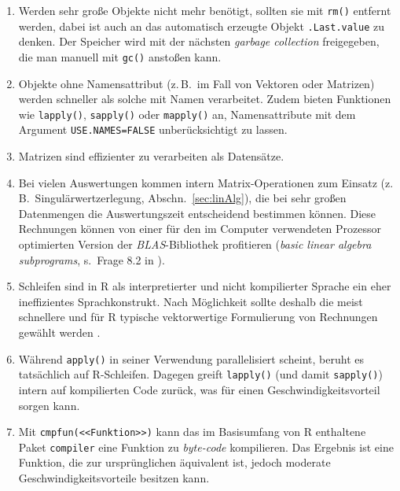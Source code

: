 \begin{enumerate}
\item Werden sehr große Objekte nicht mehr benötigt, sollten sie mit \lstinline!rm()! entfernt werden, dabei ist auch an das automatisch erzeugte Objekt \lstinline!.Last.value! zu denken. Der Speicher wird mit der nächsten \emph{garbage collection} freigegeben, die man manuell mit \lstinline!gc()! anstoßen kann.
\item Objekte ohne Namensattribut (z.\,B.\ im Fall von Vektoren oder Matrizen) werden schneller als solche mit Namen verarbeitet. Zudem bieten Funktionen wie \lstinline!lapply()!, \lstinline!sapply()! oder \lstinline!mapply()! an, Namensattribute mit dem Argument \lstinline!USE.NAMES=FALSE! unberücksichtigt zu lassen.
\item Matrizen sind effizienter zu verarbeiten als Datensätze.
\item \label{item:blas} Bei vielen Auswertungen kommen intern Matrix-Operationen zum Einsatz (z.\,B.\ Singulärwertzerlegung, Abschn.\ \ref{sec:linAlg}), die bei sehr großen Datenmengen die Auswertungszeit entscheidend bestimmen können. Diese Rechnungen können von einer für den im Computer verwendeten Prozessor optimierten Version der \emph{BLAS}-Bibliothek profitieren (\emph{basic linear algebra subprograms}, s.\ Frage 8.2 in ).
\item Schleifen sind in R als interpretierter und nicht kompilierter Sprache ein eher ineffizientes Sprachkonstrukt. Nach Möglichkeit sollte deshalb die meist schnellere und für R typische vektorwertige Formulierung von Rechnungen gewählt werden \cite{Ligges2008}.
\item Während \lstinline!apply()! in seiner Verwendung parallelisiert scheint, beruht es tatsächlich auf R-Schleifen. Dagegen greift \lstinline!lapply()! (und damit \lstinline!sapply()!) intern auf kompilierten Code zurück, was für einen Geschwindigkeitsvorteil sorgen kann.
\item Mit \lstinline!cmpfun(<<Funktion>>)! kann das im Basisumfang von R enthaltene Paket  \lstinline!compiler! eine Funktion zu \emph{byte-code} kompilieren. Das Ergebnis ist eine Funktion, die zur ursprünglichen äquivalent ist, jedoch moderate Geschwindigkeitsvorteile besitzen kann.
\end{enumerate}

